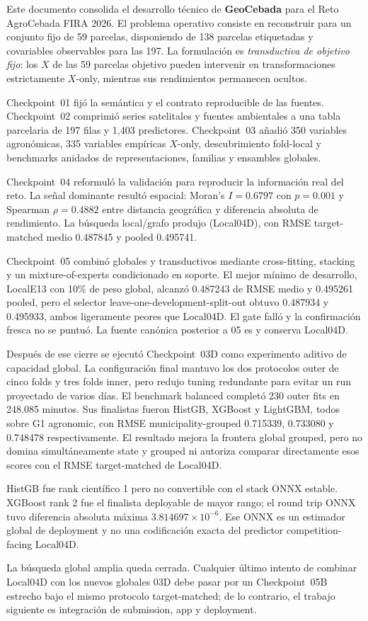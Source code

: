 Este documento consolida el desarrollo técnico de \textbf{GeoCebada} para el Reto
AgroCebada FIRA 2026. El problema operativo consiste en reconstruir
 para un conjunto fijo de 59 parcelas, disponiendo de 138
parcelas etiquetadas y covariables observables para las 197. La formulación es
\emph{transductiva de objetivo fijo}: los $X$ de las 59 parcelas objetivo pueden intervenir
en transformaciones estrictamente $X$-only, mientras sus rendimientos permanecen ocultos.

Checkpoint~01 fijó la semántica y el contrato reproducible de las fuentes. Checkpoint~02
comprimió series satelitales y fuentes ambientales a una tabla parcelaria de 197 filas y
1,403 predictores. Checkpoint~03 añadió 350 variables agronómicas, 335 variables empíricas
$X$-only, descubrimiento fold-local y benchmarks anidados de representaciones, familias y
ensambles globales.

Checkpoint~04 reformuló la validación para reproducir la información real del reto. La señal
dominante resultó espacial: Moran's $I=0.6797$ con $p=0.001$ y Spearman $\rho=0.4882$ entre
distancia geográfica y diferencia absoluta de rendimiento. La búsqueda local/grafo produjo
 (Local04D), con RMSE
target-matched medio 0.487845 y pooled 0.495741.

Checkpoint~05 combinó globales y transductivos mediante cross-fitting, stacking y un
mixture-of-experts condicionado en soporte. El mejor mínimo de desarrollo, LocalE13 con
10\% de peso global, alcanzó 0.487243 de RMSE medio y 0.495261 pooled, pero el selector
leave-one-development-split-out obtuvo 0.487934 y 0.495933, ambos ligeramente peores que
Local04D. El gate falló y la confirmación fresca no se puntuó. La fuente canónica posterior
a 05 es  y conserva Local04D.

Después de ese cierre se ejecutó Checkpoint~03D como experimento aditivo de capacidad global.
La configuración final mantuvo los dos protocolos outer de cinco folds y tres folds inner,
pero redujo tuning redundante para evitar un run proyectado de varios días. El benchmark
balanced completó 230 outer fits en 248.085 minutos. Sus finalistas fueron HistGB, XGBoost y
LightGBM, todos sobre G1 agronomic, con RMSE municipality-grouped 0.715339, 0.733080 y
0.748478 respectivamente. El resultado mejora la frontera global grouped, pero no domina
simultáneamente state y grouped ni autoriza comparar directamente esos scores con el RMSE
target-matched de Local04D.

HistGB fue rank científico 1 pero no convertible con el stack ONNX estable. XGBoost rank 2
fue el finalista deployable de mayor rango; el round trip ONNX tuvo diferencia absoluta máxima
$3.814697\times10^{-6}$. Ese ONNX es un estimador global de deployment y no una codificación
exacta del predictor competition-facing Local04D.

La búsqueda global amplia queda cerrada. Cualquier último intento de combinar Local04D con
los nuevos globales 03D debe pasar por un Checkpoint~05B estrecho bajo el mismo protocolo
target-matched; de lo contrario, el trabajo siguiente es integración de submission, app y
deployment.

